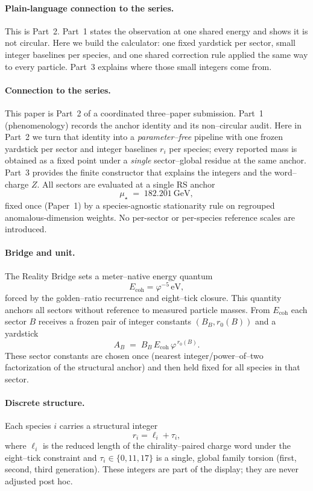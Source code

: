 \documentclass[epjc3]{svjour3}
\begin{document}
\paragraph{Plain-language connection to the series.}
This is Part~2. Part~1 states the observation at one shared energy and shows it is not circular. Here we build the calculator: one fixed yardstick per sector, small integer baselines per species, and one shared correction rule applied the same way to every particle. Part~3 explains where those small integers come from.
\paragraph{Connection to the series.}
This paper is Part~2 of a coordinated three--paper submission. Part~1 (phenomenology) records the anchor identity and its non--circular audit. Here in Part~2 we turn that identity into a \emph{parameter--free} pipeline with one frozen yardstick per sector and integer baselines $r_i$ per species; every reported mass is obtained as a fixed point under a \emph{single} sector--global residue at the same anchor. Part~3 provides the finite constructor that explains the integers and the word--charge $Z$.
All sectors are evaluated at a single RS anchor
\[
\mu_\star \;=\; 182.201~\mathrm{GeV},
\]
fixed once (Paper~1) by a species-agnostic stationarity rule on regrouped anomalous-dimension weights. No per-sector or per-species reference scales are introduced.

\paragraph{Bridge and unit.}
The Reality Bridge sets a meter–native energy quantum
\[
E_{\mathrm{coh}}=\varphi^{-5}\,\mathrm{eV},
\]
forced by the golden–ratio recurrence and eight–tick closure. This quantity anchors all sectors without reference to measured particle masses. From $E_{\mathrm{coh}}$ each sector $B$ receives a frozen pair of integer constants $(B_B,r_0(B))$ and a yardstick
\[
A_B \;=\; B_B\,E_{\mathrm{coh}}\,\varphi^{\,r_0(B)}.
\]
These sector constants are chosen once (nearest integer/power–of–two factorization of the structural anchor) and then held fixed for all species in that sector.

\paragraph{Discrete structure.}
Each species $i$ carries a structural integer
\[
r_i=\ell_i+\tau_i,
\]
where $\ell_i$ is the reduced length of the chirality–paired charge word under the eight–tick constraint and $\tau_i\in\{0,11,17\}$ is a single, global family torsion (first, second, third generation). These integers are part of the display; they are never adjusted post hoc.
\end{document}
